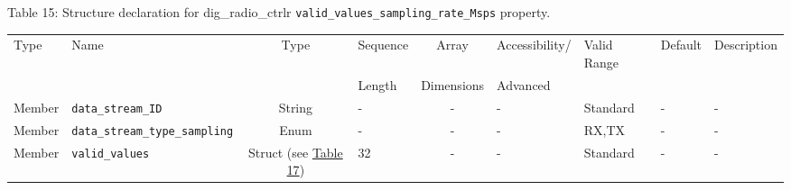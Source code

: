 \documentclass{article}
\def\comp{dig\_radio\_ctrlr}
\begin{document}
\begin{landscape}
	\noindent Table \hypertarget{tab15}{15}: Structure declaration for \comp{} \verb+valid_values_sampling_rate_Msps+ property.
	\begin{scriptsize}
		\noindent\begin{longtable}{|p{1.8cm}|p{3.6cm}|c|p{2cm}|c|p{2cm}|p{1.7cm}|p{0.8cm}|p{4.97cm}|}
			\hline
			\rowcolor{blue}
			Type         & Name                                & Type & Sequence & Array      & Accessibility/ & Valid Range  & Default & Description                                                                                                                                                                                                                       \\
			\rowcolor{blue}
			             &                                     &      & Length   & Dimensions & Advanced       &              &         &                                                                                                                                                                                                                             \\
			\hline
			Member       & \verb+data_stream_ID+               & String& -       & -          & -              & Standard     & -       & - \\
			\hline
			Member       & \verb+data_stream_type_sampling+    & Enum  & -       & -          & -              & RX,TX        & -       & - \\
			\hline
			Member       & \verb+valid_values+                 & Struct (see \hyperlink{tab17}{Table 17}) & 32      & -          & -              & Standard & -       & - \\
			\hline
		\end{longtable}
	\end{scriptsize}


\end{landscape}
\end{document}
